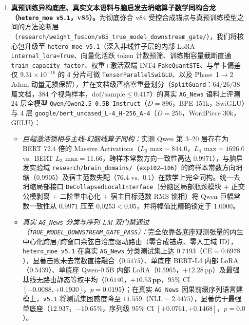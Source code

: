 \documentclass[10pt,twoside]{article}
\theoremstyle{definition}
\theoremstyle{plain}
\theoremstyle{remark}
\begin{document}
\begin{enumerate}[leftmargin=1.6em, itemsep=1pt, parsep=0pt]
\begin{itemize}[leftmargin=1.4em, itemsep=0.5pt, parsep=0pt]
        \item \emph{序列语言建模（$480 \times 16$ tokens，8 个预训练形态变体先验）：}\texttt{v5} 留出测试集困惑度达 $\mathbf{4.259}$，相对最强单专家（$8.054$）降低 $\mathbf{47.1\%}$，而无预训练专家先验的单专家无融合基线停留在 $\mathrm{PPL}=15.300$（\texttt{single\_lora4}）与 $15.347$（\texttt{single\_trainable}）。
    \end{itemize}
    \item \textbf{真预训练异构底座、真实文本语料与脑启发去坍缩算子数学同构合龙（\texttt{hetero\_moe v5.1}，v85）。}为彻底弥合 v84 受控合成锚点与真预训练模型之间的方法论断层（\texttt{research/weight\_fusion/v85\_true\_model\_downstream\_gate/}），我们将核心包升级至 \texttt{hetero\_moe v5.1}（深入非线性子层的内部 LoRA \texttt{internal\_lora=True}、向量化活跃 token 计数预筛、训练期容量截断直通 \texttt{train\_capacity\_factor}、权重+激活双端 INT4 \texttt{FakeQuantSTE}、与单卡偏差仅 $9.31\times 10^{-10}$ 的 4 分片可微 \texttt{TensorParallelSwiGLU}、以及 Phase~1$\to$2 Adam 动量无损保留），并在文档级严格零重叠划分（\texttt{SplitGuard}：$64/26/38$ 篇文档，$384$ 个视角样本，$\text{dof/sample}\le 0.417$）的真实 \texttt{AG\_News} 语料上评测 24 层全模型 \texttt{Qwen/Qwen2.5-0.5B-Instruct}（$D{=}896$，BPE 151k，SwiGLU）与 4 层 \texttt{google/bert\_uncased\_L-4\_H-256\_A-4}（$D{=}256$，WordPiece 30k，GELU）：
    \begin{itemize}[leftmargin=1.4em, itemsep=0.5pt, parsep=0pt]
        \item \emph{巨幅激活锁相与主线-幻脑线算子同构：}实测 Qwen 第 3--20 层存在为 BERT $72.4$ 倍的 Massive Activations（$L_3\text{ max}=844.0$，$L_4\text{ max}=1696.0$ vs.\ BERT $L_3\text{ max}=11.66$，跨样本常数方向一致性高达 $0.9971$），与脑启发实验域 \texttt{research/brain\_domains/}（\texttt{exp102--106}）的跨样本常数方向坍缩（$0.9905$）及宿主范数失配（$76.4$ vs.\ $0.1$）在数学上完全同构。统一去坍缩局部接口 \texttt{DeCollapsedLocalInterface}（分脑区局部瓶颈模块 $+$ 正交公模剥离 $+$ 二阶重中心化 $+$ 宿主目标范数 RMS 锁相）将 Qwen 巨幅常数一致性从 $0.9971$ 压至 $\mathbf{0.0253} < 0.05$，并将幅值比精确锁定于 $\mathbf{1.0000}$。
        \item \emph{真实 \texttt{AG\_News} 分类与序列 LM 双门禁通过（\texttt{TRUE\_MODEL\_DOWNSTREAM\_GATE\_PASS}）：}完全依靠各底座观测张量的内生中心化跨层/跨窗口余弦自洽度驱动路由（零合成锚点、零人工域 ID），\texttt{hetero\_moe v5.1} 在真实 \texttt{AG\_News} 分类测试集上达 $\mathbf{0.7193}$（$\mathrm{CE}=0.6978$），显著击败未去常数直接融合（$0.5175$）、单底座 BERT-L4 内部 LoRA（$0.5439$）、单底座 Qwen-0.5B 内部 LoRA（$0.5965$，$+12.28\,\text{pp}$）及最强基线无路由静态等权平均（$0.6140$，$\mathbf{+10.53\,\text{pp}}$，$95\%$ CI $[+0.0088, +0.1930]$，$p{=}0.0195$）；在真实 \texttt{AG\_News} 因果前缀序列语言建模上，\texttt{v5.1} 将测试集困惑度降至 $\mathbf{11.559}$（$\mathrm{NLL}=2.4475$），显著优于最强单底座（$12.937$，$\mathbf{-10.65\%}$，序列级 $95\%$ CI $[+0.0761, +0.1468]$，$p{=}0.0$）。
    \end{itemize}
\end{enumerate}
\end{document}
